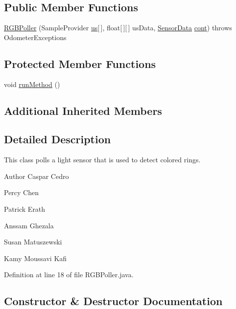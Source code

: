 \subsection*{Public Member Functions}
\begin{DoxyCompactItemize}
\item 
\hyperlink{classca_1_1mcgill_1_1ecse211_1_1threads_1_1_r_g_b_poller_a7e23e2fe527b2ecbf4ddc8f988dd70a5}{R\+G\+B\+Poller} (Sample\+Provider \hyperlink{classca_1_1mcgill_1_1ecse211_1_1threads_1_1_light_poller_ab6a9cb770bbf71f586697633db1475ff}{us}\mbox{[}$\,$\mbox{]}, float\mbox{[}$\,$\mbox{]}\mbox{[}$\,$\mbox{]} us\+Data, \hyperlink{classca_1_1mcgill_1_1ecse211_1_1threads_1_1_sensor_data}{Sensor\+Data} \hyperlink{classca_1_1mcgill_1_1ecse211_1_1threads_1_1_light_poller_ab6a9050ced4f6940add4735c8872194a}{cont})  throws Odometer\+Exceptions 
\end{DoxyCompactItemize}
\subsection*{Protected Member Functions}
\begin{DoxyCompactItemize}
\item 
void \hyperlink{classca_1_1mcgill_1_1ecse211_1_1threads_1_1_r_g_b_poller_a96db4561c87136de5098497fe30356fe}{run\+Method} ()
\end{DoxyCompactItemize}
\subsection*{Additional Inherited Members}


\subsection{Detailed Description}
This class polls a light sensor that is used to detect colored rings.

\begin{DoxyAuthor}{Author}
Caspar Cedro 

Percy Chen 

Patrick Erath 

Anssam Ghezala 

Susan Matuszewski 

Kamy Moussavi Kafi 
\end{DoxyAuthor}


Definition at line 18 of file R\+G\+B\+Poller.\+java.



\subsection{Constructor \& Destructor Documentation}
\mbox{\label{classca_1_1mcgill_1_1ecse211_1_1threads_1_1_r_g_b_poller_a7e23e2fe527b2ecbf4ddc8f988dd70a5}} 
